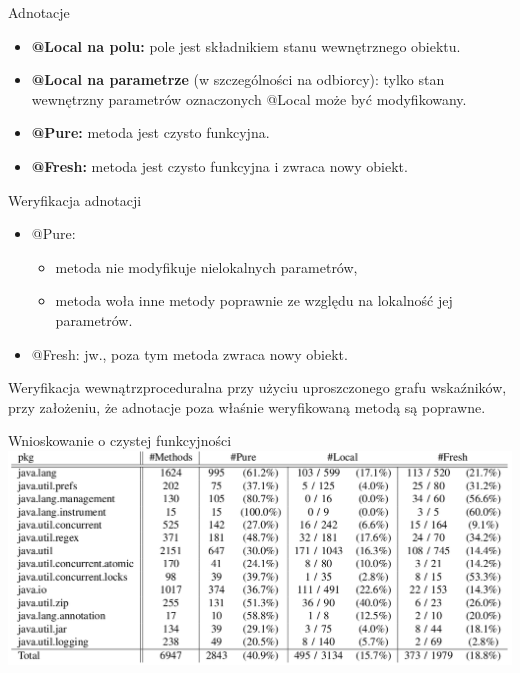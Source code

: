 \documentclass[handout]{beamer}
\begin{document}
\begin{frame}{Adnotacje}
  \begin{itemize}
    \item \textbf{{\color{annot} @Local} na polu:} pole jest
      składnikiem stanu wewnętrznego obiektu.
    \item \textbf{{\color{annot} @Local} na parametrze} (w
      szczególności na odbiorcy): tylko stan wewnętrzny parametrów
      oznaczonych {\color{annot} @Local} może być modyfikowany.
    \item \textbf{{\color{annot} @Pure}:} metoda jest czysto funkcyjna.
    \item \textbf{{\color{annot} @Fresh}:} metoda jest czysto funkcyjna
      i zwraca nowy obiekt.
  \end{itemize}
\end{frame}

\begin{frame}{Weryfikacja adnotacji}
  \begin{itemize}
    \item {\color{annot} @Pure}:
      \begin{itemize}
        \item metoda nie modyfikuje nielokalnych parametrów, 
        \item metoda woła inne metody poprawnie ze względu na
          lokalność jej parametrów.
      \end{itemize}
    \item {\color{annot} @Fresh}: jw., poza tym metoda zwraca nowy
      obiekt.
  \end{itemize}
  \pause
  Weryfikacja wewnątrzproceduralna przy użyciu uproszczonego grafu
  wskaźników, przy założeniu, że adnotacje poza właśnie weryfikowaną
  metodą są poprawne.
\end{frame}

\begin{frame}{Wnioskowanie o czystej funkcyjności}
  \includegraphics[width=\columnwidth]{img/experiment.png}
\end{frame}
\end{document}
